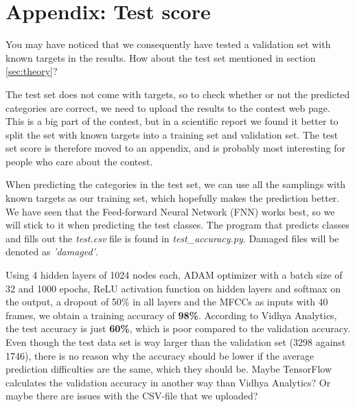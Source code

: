 \section*{Appendix: Test score}
You may have noticed that we consequently have tested a validation set with known targets in the results. How about the test set mentioned in section \ref{sec:theory}?

The test set does not come with targets, so to check whether or not the predicted categories are correct, we need to upload the results to the contest web page. This is a big part of the contest, but in a scientific report we found it better to split the set with known targets into a training set and validation set. The test set score is therefore moved to an appendix, and is probably most interesting for people who care about the contest.

When predicting the categories in the test set, we can use all the samplings with known targets as our training set, which hopefully makes the prediction better. We have seen that the Feed-forward Neural Network (FNN) works best, so we will stick to it when predicting the test classes. The program that predicts classes and fills out the \textit{test.csv} file is found in \textit{test\_accuracy.py}. Damaged files will be denoted as \textit{'damaged'}.

Using 4 hidden layers of 1024 nodes each, ADAM optimizer with a batch size of 32 and 1000 epochs, ReLU activation function on hidden layers and softmax on the output, a dropout of 50\% in all layers and the MFCCs as inputs with 40 frames, we obtain a training accuracy of \textbf{98\%}. According to Vidhya Analytics, the test accuracy is just \textbf{60\%}, which is poor compared to the validation accuracy. Even though the test data set is way larger than the validation set (3298 against 1746), there is no reason why the accuracy should be lower if the average prediction difficulties are the same, which they should be. Maybe TensorFlow calculates the validation accuracy in another way than Vidhya Analytics? Or maybe there are issues with the CSV-file that we uploaded?